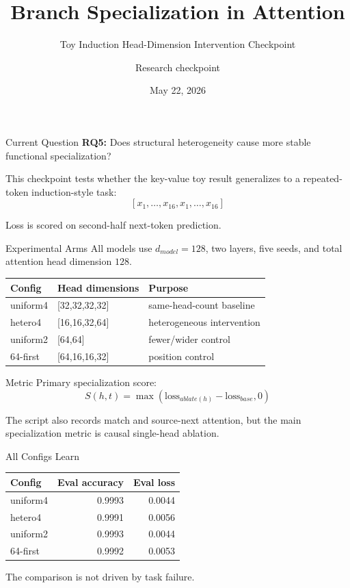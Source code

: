 \documentclass[aspectratio=169]{beamer}
\title{Branch Specialization in Attention}
\subtitle{Toy Induction Head-Dimension Intervention Checkpoint}
\author{Research checkpoint}
\date{May 22, 2026}
\begin{document}
\begin{frame}
  \titlepage
\end{frame}

\begin{frame}{Current Question}
  \textbf{RQ5:} Does structural heterogeneity cause more stable functional
  specialization?

  \vspace{0.7em}
  This checkpoint tests whether the key-value toy result generalizes to a
  repeated-token induction-style task:
  \[
    [x_1,\ldots,x_{16},x_1,\ldots,x_{16}]
  \]

  Loss is scored on second-half next-token prediction.
\end{frame}

\begin{frame}{Experimental Arms}
  All models use \(d_{model}=128\), two layers, five seeds, and total attention
  head dimension \(128\).

  \begin{table}
    \centering
    \begin{tabular}{lll}
      \toprule
      Config & Head dimensions & Purpose \\
      \midrule
      uniform4 & [32,32,32,32] & same-head-count baseline \\
      hetero4 & [16,16,32,64] & heterogeneous intervention \\
      uniform2 & [64,64] & fewer/wider control \\
      64-first & [64,16,16,32] & position control \\
      \bottomrule
    \end{tabular}
  \end{table}
\end{frame}

\begin{frame}{Metric}
  Primary specialization score:
  \[
    S(h,t)=\max(\mathrm{loss}_{ablate(h)}-\mathrm{loss}_{base},0)
  \]

  \vspace{0.7em}
  The script also records match and source-next attention, but the main
  specialization metric is causal single-head ablation.
\end{frame}

\begin{frame}{All Configs Learn}
  \begin{table}
    \centering
    \begin{tabular}{lrr}
      \toprule
      Config & Eval accuracy & Eval loss \\
      \midrule
      uniform4 & 0.9993 & 0.0044 \\
      hetero4 & 0.9991 & 0.0056 \\
      uniform2 & 0.9993 & 0.0044 \\
      64-first & 0.9992 & 0.0053 \\
      \bottomrule
    \end{tabular}
  \end{table}

  The comparison is not driven by task failure.
\end{frame}
\end{document}
